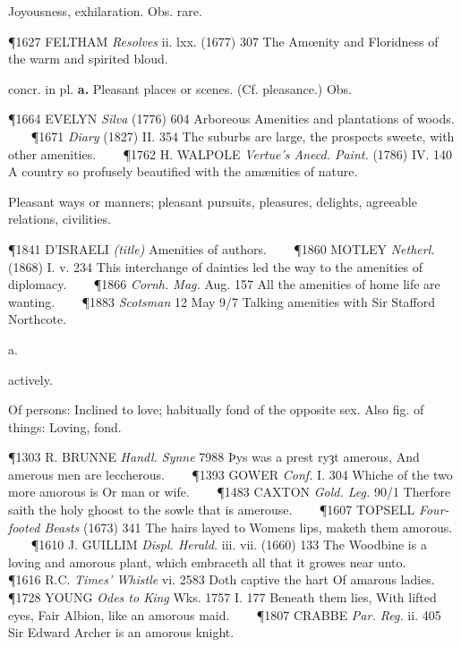 \begin{description}[wide, labelwidth=!, labelindent=0pt]
\begin{myenumerate}
 Joyousness, exhilaration. Obs. rare. 

\P 1627 FELTHAM \textit{Resolves} ii. lxx. (1677) 307 The Amœnity and Floridness of the warm and spirited bloud.

 concr. in pl. \textbf{a.} Pleasant places or scenes. (Cf. pleasance.) Obs. 

\P 1664 EVELYN \textit{Silva} (1776) 604 Arboreous Amenities and plantations of woods.    
\P 1671 \textit{Diary} (1827) II. 354 The suburbs are large, the prospects sweete, with other amenities.    
\P 1762 H. WALPOLE \textit{Vertue's Anecd. Paint.} (1786) IV. 140 A country so profusely beautified with the amænities of nature.

 Pleasant ways or manners; pleasant pursuits, pleasures, delights, agreeable relations, civilities. 

\P 1841 D'ISRAELI \textit{(title)} Amenities of authors.    
\P 1860 MOTLEY \textit{Netherl.} (1868) I. v. 234 This interchange of dainties led the way to the amenities of diplomacy.    
\P 1866 \textit{Cornh. Mag.} Aug. 157 All the amenities of home life are wanting.    
\P 1883 \textit{Scotsman} 12 May 9/7 Talking amenities with Sir Stafford Northcote.
\end{myenumerate}


  a.

\noindent  {}

\vspace{-0.3cm}

\begin{myenumerate}
 actively. 

 Of persons: Inclined to love; habitually fond of the opposite sex. Also fig. of things: Loving, fond. 

\P 1303 R. BRUNNE \textit{Handl. Synne} 7988 Þys was a prest ryȝt amerous, And amerous men are leccherous.    
\P 1393 GOWER \textit{Conf.} I. 304 Whiche of the two more amorous is Or man or wife.    
\P 1483 CAXTON \textit{Gold. Leg.} 90/1 Therfore saith the holy ghoost to the sowle that is amerouse.    
\P 1607 TOPSELL \textit{Four-footed Beasts} (1673) 341 The hairs layed to Womens lips, maketh them amorous.    
\P 1610 J. GUILLIM \textit{Displ. Herald.} iii. vii. (1660) 133 The Woodbine is a loving and amorous plant, which embraceth all that it growes near unto.    
\P 1616 R.C. \textit{Times' Whistle} vi. 2583 Doth captive the hart Of amarous ladies.    
\P 1728 YOUNG \textit{Odes to King} Wks. 1757 I. 177 Beneath them lies, With lifted eyes, Fair Albion, like an amorous maid.    
\P 1807 CRABBE \textit{Par. Reg.} ii. 405 Sir Edward Archer is an amorous knight.


\end{myenumerate}
\end{description}
